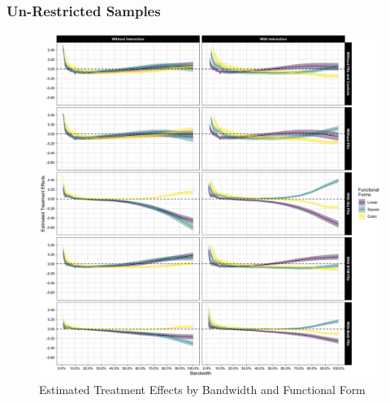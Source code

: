 \subsubsection{Un-Restricted Samples}
\begin{figure}
    \centering
    \includegraphics[scale = 0.13]{02_Plots/Regression-Results_RD-Design_Treatment-Effect-by-BW_All-Models}
    \caption{Estimated Treatment Effects by Bandwidth and Functional Form}
    \label{Figure:Estimated-Treatment-Effects_By-Functional-Form}
\end{figure}

\clearpage
